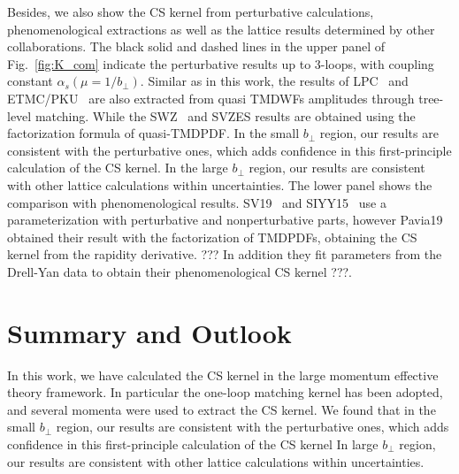 \documentclass[prd,aps,twocolumn,preprintnumbers, showpacs, nofootinbib,superscriptaddress,notitlepage]{revtex4-1}
\newcommand\bl{\color{blue}}
\begin{document}
Besides, we also show {\bl the CS kernel from} perturbative calculations, phenomenological extractions as well as the lattice results determined by other collaborations. The black solid and dashed lines in the upper panel of Fig.~\ref{fig:K_com} indicate the perturbative results  up to 3-loops, with coupling constant $\alpha_s(\mu=1/b_{\perp})$. Similar {\bl as in} this work, the results of LPC~\cite{LatticeParton:2020uhz} and ETMC/PKU~\cite{Li:2021wvl} are also extracted 
from {\bl quasi} TMDWFs amplitudes through tree-level {\bl matching}. While the SWZ~\cite{Shanahan:2021tst} and SVZES\cite{Schlemmer:2021aij} results are obtained {\bl using } the factorization formula of quasi-TMDPDF.  In the small $b_{\perp}$ region, our results are consistent with the perturbative ones, which {\bl adds confidence in this} first-principle calculation of {\bl the} CS kernel. In {\bl the} large $b_{\perp}$ region, our results are consistent with other lattice calculations within uncertainties. The lower panel shows the comparison with phenomenological results. {\bl SV19}~\cite{Scimemi:2019cmh} and SIYY15~\cite{Sun:2014dqm} {\bl use  a parameterization} with perturbative and nonperturbative parts, however Pavia19~\cite{Bacchetta:2019sam} {\bl obtained} their result with the factorization of TMDPDFs, {\bl obtaining the} CS kernel {\bl from} the rapidity derivative. {\bl ??? In addition they fit parameters from the Drell-Yan data to obtain their phenomenological CS kernel ???}.



\section{Summary and Outlook}
\label{sec:summary}

In this work, we have calculated the CS kernel in the large momentum effective theory framework. In particular  the one-loop matching kernel has been adopted, and several momenta {\bl were} used to extract the CS kernel. We found that in the small $b_{\perp}$ region, our results are consistent with  the perturbative ones, which {\bl adds confidence in this} first-principle calculation of {\bl the} CS kernel %
In large $b_{\perp}$ region, our results are consistent with other lattice calculations within uncertainties. 
\end{document}

